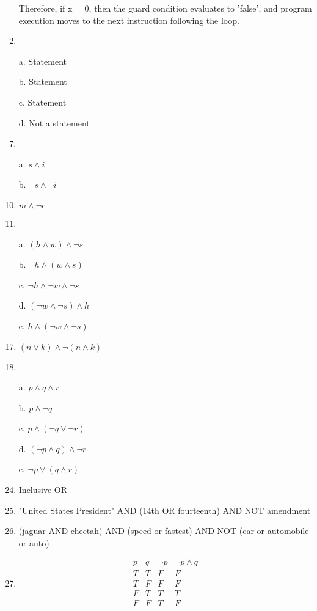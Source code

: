 \documentclass{article}
\begin{document}
\begin{enumerate}[label=\textbf{\arabic*.}]
Therefore, if x = 0, then the guard condition evaluates to 'false', and program execution moves to the next instruction following the loop.
\item %
\item[a.] Statement
\item[b.] Statement
\item[c.] Statement
\item[d.] Not a statement
\item %
\item[a.] $s \land i$
\item[b.] $\neg s \land \neg i$
\item %
$m \land \neg c$
\item %
\item[a.] $(h \land w) \land \neg s$
\item[b.] $\neg h \land (w \land s)$
\item[c.] $\neg h \land \neg w \land \neg s$
\item[d.] $(\neg w \land \neg s) \land h$
\item[e.] $h \land (\neg w \land \neg s)$
\item %
$(n \lor k) \land \neg (n \land k)$
\item %
\item[a.] $p \land q \land r$
\item[b.] $p \land \neg q$
\item[c.] $p \land (\neg q \lor \neg r)$
\item[d.] $(\neg p \land q) \land \neg r$
\item[e.] $\neg p \lor (q \land r)$
\item %
Inclusive OR
\item %
"United States President" AND (14th OR fourteenth) AND NOT amendment
\item %
(jaguar AND cheetah) AND (speed or fastest) AND NOT (car or automobile or auto)
\item %
\[
\begin{array}{|c|c||c||c|}
\hline
p & q & \neg p & \neg p \land q\\
\hline
T & T & F & F \\
T & F & F & F \\
F & T & T & T \\
F & F & T & F \\

\end{array}\]
\end{enumerate}
\end{document}

